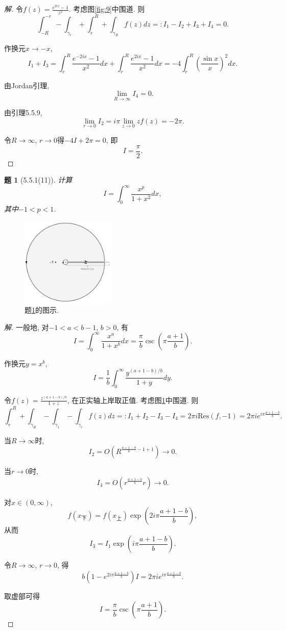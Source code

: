 \documentclass{article}[a4paper, 12pt]
\theoremstyle{mystyle}
\newtheorem{problem}{题}
\newenvironment{solution}{\begin{proof}[解]}{\end{proof}}
\begin{document}
\begin{solution}
  令\(f(z)=\frac{e^{2iz}-1}{z^2}\). 考虑图\ref{fig:9}中围道. 则\[\int_{-R}^{-r}-\int_{\gamma_r}+\int_{r}^R+\int_{\gamma_R} f(z)dz=:I_1-I_2+I_3+I_4=0.\]

  作换元\(x\to -x\), \[I_1+I_3=\int_r^R \frac{e^{-2ix}-1}{x^2}dx+\int_r^R \frac{e^{2ix}-1}{x^2}dx=-4\int_r^R \left(\frac{\sin x}{x}\right)^2dx.\]

  由Jordan引理, \[\lim_{R\to\infty} I_4=0.\]

  由引理5.5.9, \[\lim_{r\to0}I_2=i\pi\lim_{z\to0}zf(z)=-2\pi.\]

  令\(R\to\infty\), \(r\to0\)得\(-4I+2\pi=0\), 即\[I=\frac{\pi}{2}.\tag*{\(\qed\)}\]
  \renewcommand{\qedsymbol}{}
\end{solution}

\begin{problem}[5.5.1(11)] \label{11}
  计算\[I=\int_0^\infty \frac{x^p}{1+x^2}dx,\] 其中\(-1<p<1\).
\end{problem}

\begin{figure}[htbp]
  \centering
  \includegraphics[width=0.4\textwidth]{images/11.png}
  \caption{题\ref{11}的图示.}
  \label{fig:11}
\end{figure}

\begin{solution}
  一般地, 对\(-1<a<b-1\), \(b>0\), 有\[I=\int_0^\infty \frac{x^a}{1+x^b}dx=\frac{\pi}{b}\csc\left(\pi\frac{a+1}{b}\right).\]

  作换元\(y=x^b\), \[I=\frac{1}{b}\int_0^\infty\frac{y^{(a+1-b)/b}}{1+y}dy.\]

  令\(f(z)=\frac{z^{(a+1-b)/b}}{1+z}\), 在正实轴上岸取正值. 考虑图\ref{fig:11}中围道. 则\[\int_{r}^{R}+\int_{\gamma_R}-\int_{\gamma_1}-\int_{\gamma_r} f(z)dz=:I_1+I_2-I_3-I_4=2\pi i\text{Res}(f,-1)=2\pi i e^{i\pi \frac{a+1-b}{b}}.\]

  当\(R\to\infty\)时, \[I_2=O\left(R^{\frac{a+1-b}{b}-1+1}\right)\to0.\]

  当\(r\to0\)时, \[I_4=O\left(r^{\frac{a+1-b}{b}}r\right)\to0.\]

  对\(x\in(0,\infty)\), \[f(x_{\text{下}})=f(x_{\text{上}})\exp\left(2i\pi\frac{a+1-b}{b}\right),\] 从而\[I_3=I_1\exp\left(i\pi\frac{a+1-b}{b}\right).\]

  令\(R\to\infty\), \(r\to 0\), 得\[b\left(1-e^{2i\pi \frac{a+1-b}{b}}\right)I=2\pi i e^{i\pi \frac{a+1-b}{b}}.\]

  取虚部可得\[I=\frac{\pi}{b}\csc\left(\pi\frac{a+1}{b}\right). \tag*{\(\qed\)}\]
  \renewcommand{\qedsymbol}{}
\end{solution}
\end{document}
